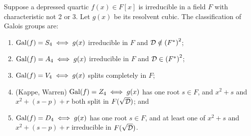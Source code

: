 \begin{theorem}
    Suppose a depressed quartic \(f(x) \in F[x]\) is irreducible
    in a field \(F\) with characteristic not 2 or 3.
    Let \(g(x)\) be its resolvent cubic.
    The classification of Galois groups are:
    \begin{enumerate}[label={(\alph*)}, itemsep=0mm]
        \item \(\operatorname{Gal}(f) = S_4 \iff g(x)\) irreducible in \(F\) and \(\mathcal{D} \notin {(F^\ast)}^2\);
        \item \(\operatorname{Gal}(f) = A_4 \iff g(x)\) irreducible in \(F\) and \(\mathcal{D} \in {(F^\ast)}^2\);
        \item \(\operatorname{Gal}(f) = V_4 \iff g(x)\) splits completely in \(F\);
        \item (Kappe, Warren) \(\operatorname{Gal}(f) = Z_4 \iff g(x)\) has one root \(s \in F\),
            and \(x^2 + s\) and \(x^2 + (s-p) + r\) both split in \(F(\sqrt{\mathcal{D}})\); and
        \item \(\operatorname{Gal}(f) = D_4 \iff g(x)\) has one root \(s \in F\),
            and at least one of \(x^2 + s\) and \(x^2 + (s-p) + r\) irreducible in \(F(\sqrt{\mathcal{D}})\).
    \end{enumerate}
\end{theorem}
